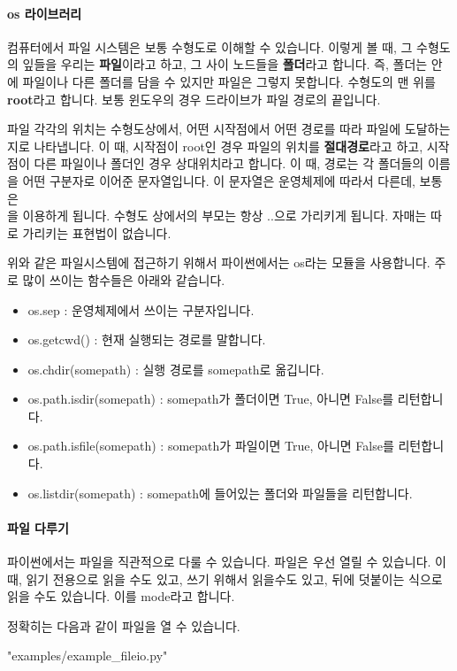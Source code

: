 \documentclass[twoside]{article}
\begin{document}
\paragraph{os 라이브러리} 컴퓨터에서 파일 시스템은 보통 수형도로 이해할 수 있습니다. 이렇게 볼 때, 그 수형도의 잎들을 우리는 \textbf{파일}이라고 하고, 그 사이 노드들을 \textbf{폴더}라고 합니다. 즉, 폴더는 안에 파일이나 다른 폴더를 담을 수 있지만 파일은 그렇지 못합니다. 수형도의 맨 위를 \textbf{root}라고 합니다. 보통 윈도우의 경우 드라이브가 파일 경로의 끝입니다. 

파일 각각의 위치는 수형도상에서, 어떤 시작점에서 어떤 경로를 따라 파일에 도달하는지로 나타냅니다. 이 때, 시작점이 root인 경우 파일의 위치를 \textbf{절대경로}라고 하고, 시작점이 다른 파일이나 폴더인 경우 상대위치라고 합니다. 이 때, 경로는 각 폴더들의 이름을 어떤 구분자로 이어준 문자열입니다. 이 문자열은 운영체제에 따라서 다른데, 보통은 \\을 이용하게 됩니다. 수형도 상에서의 부모는 항상 ..으로 가리키게 됩니다. 자매는 따로 가리키는 표현법이 없습니다. 

위와 같은 파일시스템에 접근하기 위해서 파이썬에서는 os라는 모듈을 사용합니다. 주로 많이 쓰이는 함수들은 아래와 같습니다. 

\begin{itemize} 
\item os.sep : 운영체제에서 쓰이는 구분자입니다. 
\item os.getcwd() : 현재 실행되는 경로를 말합니다. 
\item os.chdir(somepath) : 실행 경로를 somepath로 옮깁니다. 
\item os.path.isdir(somepath) : somepath가 폴더이면 True, 아니면 False를 리턴합니다. 
\item os.path.isfile(somepath) : somepath가 파일이면 True, 아니면 False를 리턴합니다. 
\item os.listdir(somepath) : somepath에 들어있는 폴더와 파일들을 리턴합니다. 
\end{itemize}

\paragraph{파일 다루기} 파이썬에서는 파일을 직관적으로 다룰 수 있습니다. 파일은 우선 열릴 수 있습니다. 이 때, 읽기 전용으로 읽을 수도 있고, 쓰기 위해서 읽을수도 있고, 뒤에 덧붙이는 식으로 읽을 수도 있습니다. 이를 mode라고 합니다. 

정확히는 다음과 같이 파일을 열 수 있습니다. 



                {"examples/example_fileio.py"}
\end{document}
